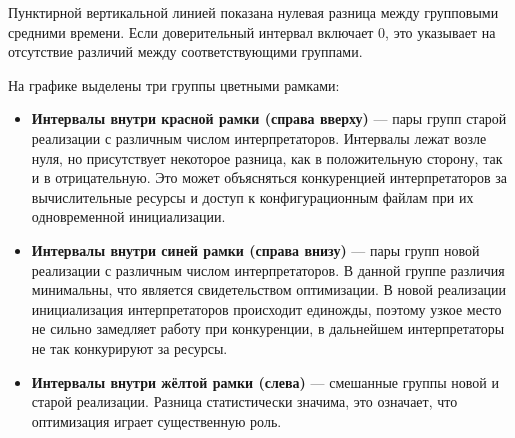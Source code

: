 Пунктирной вертикальной линией показана
нулевая разница между групповыми средними времени.
Если доверительный интервал включает 0,
это указывает на отсутствие различий
между соответствующими группами.

На графике выделены три группы цветными рамками:
\begin{itemize}
    \item \textbf{Интервалы внутри красной рамки (справа вверху)} ---
        пары групп старой реализации с различным числом интерпретаторов.
        Интервалы лежат возле нуля, но присутствует
        некоторое разница, как в положительную сторону,
        так и в отрицательную. Это может объясняться
        конкуренцией интерпретаторов
        за вычислительные ресурсы и доступ к конфигурационным файлам
        при их одновременной инициализации.
    \item \textbf{Интервалы внутри синей рамки (справа внизу)} ---
        пары групп новой реализации с различным числом интерпретаторов.
        В данной группе различия минимальны,
        что является свидетельством оптимизации.
        В новой реализации инициализация интерпретаторов
        происходит единожды, поэтому
        узкое место не сильно замедляет работу
        при конкуренции, в дальнейшем
        интерпретаторы не так конкурируют за ресурсы.
    \item \textbf{Интервалы внутри жёлтой рамки (слева)} ---
        смешанные группы новой и старой реализации.
        Разница статистически значима,
        это означает, что оптимизация играет существенную роль.
\end{itemize}


